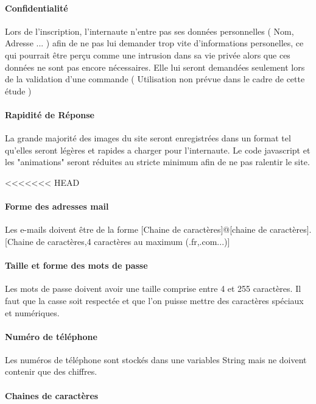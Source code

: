 \paragraph{Confidentialité}

Lors de l'inscription, l'internaute n'entre pas ses données personnelles ( Nom, Adresse ... ) afin de ne pas lui demander trop vite
d'informations personelles, ce qui pourrait être perçu comme une intrusion dans sa vie privée alors que ces données ne sont pas encore
nécessaires. Elle lui seront demandées seulement lors de la validation d'une commande ( Utilisation non prévue dans le cadre de cette étude )

\paragraph{Rapidité de Réponse}
	
La grande majorité des images du site seront enregistrées dans un format tel qu'elles seront légères et rapides a charger pour l'internaute.
Le code javascript et les "animations" seront réduites au stricte minimum afin de ne pas ralentir le site.

<<<<<<< HEAD
\paragraph{Forme des adresses mail}

Les e-mails doivent être de la forme [Chaine de caractères]@[chaine de caractères].[Chaine de caractères,4 caractères au maximum (.fr,.com...)]

\paragraph{Taille et forme des mots de passe}

Les mots de passe doivent avoir une taille comprise entre 4 et 255 caractères. Il faut que la casse soit respectée et que l'on puisse mettre des caractères spéciaux et numériques.

\paragraph{Numéro de téléphone}

Les numéros de téléphone sont stockés dans une variables String mais ne doivent contenir que des chiffres.

\paragraph{Chaines de caractères}

